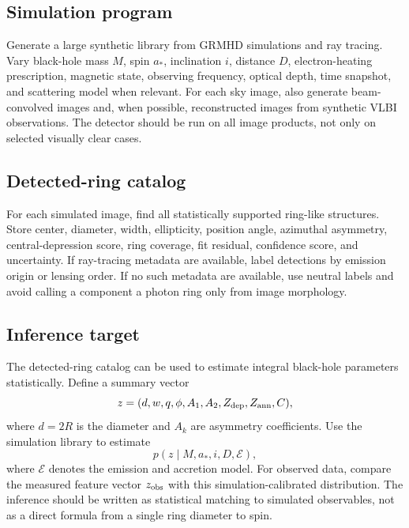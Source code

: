 \documentclass[11pt]{article}
\begin{document}
\subsection{Simulation program}
Generate a large synthetic library from GRMHD simulations and ray tracing. Vary black-hole mass $M$, spin $a_*$, inclination $i$, distance $D$, electron-heating prescription, magnetic state, observing frequency, optical depth, time snapshot, and scattering model when relevant. For each sky image, also generate beam-convolved images and, when possible, reconstructed images from synthetic VLBI observations. The detector should be run on all image products, not only on selected visually clear cases.

\subsection{Detected-ring catalog}
For each simulated image, find all statistically supported ring-like structures. Store center, diameter, width, ellipticity, position angle, azimuthal asymmetry, central-depression score, ring coverage, fit residual, confidence score, and uncertainty. If ray-tracing metadata are available, label detections by emission origin or lensing order. If no such metadata are available, use neutral labels and avoid calling a component a photon ring only from image morphology.

\subsection{Inference target}
The detected-ring catalog can be used to estimate integral black-hole parameters statistically. Define a summary vector
\begin{equation}
    z = (d, w, q, \phi, A_1, A_2, Z_{\rm dep}, Z_{\rm ann}, C),
\end{equation}
where $d=2R$ is the diameter and $A_k$ are asymmetry coefficients. Use the simulation library to estimate
\begin{equation}
    p(z \mid M,a_*,i,D,\mathcal{E}),
\end{equation}
where $\mathcal{E}$ denotes the emission and accretion model. For observed data, compare the measured feature vector $z_{\rm obs}$ with this simulation-calibrated distribution. The inference should be written as statistical matching to simulated observables, not as a direct formula from a single ring diameter to spin.
\end{document}
